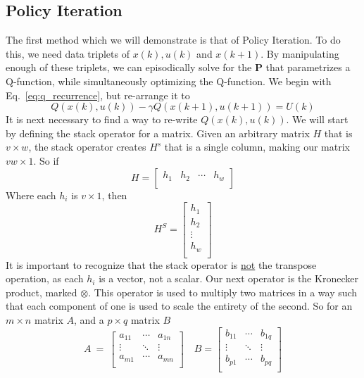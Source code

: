 \FloatBarrier\subsection{Policy Iteration} %
The first method which we will demonstrate is that of Policy Iteration. To do this, we need data triplets of $x\left(k\right),u\left(k\right)$ and $x\left(k+1\right)$. By manipulating enough of these triplets, we can episodically solve for the \textbf{P} that parametrizes a Q-function, while simultaneously optimizing the Q-function. We begin with Eq.~\ref{eq:q_recurrence}, but re-arrange it to
\begin{equation}
    Q\left(x\left(k\right),u\left(k\right)\right) - \gamma Q\left(x\left(k+1\right),u\left(k+1\right)\right)=U\left(k\right)
    \label{eq:q-gamma_q}
\end{equation}
It is next necessary to find a way to re-write $Q\left(x\left(k\right),u\left(k\right)\right)$. 
We will start by defining the stack operator for a matrix. Given an arbitrary matrix $H$ that is $v\times w$, the stack operator creates $H^s$ that is a single column, making our matrix $vw \times1$. So if
\begin{equation}
    H = \left[\begin{matrix}h_1&h_2&\cdots&h_w\\\end{matrix}\right]
    \label{eq:H_prestack}
\end{equation}
Where each $h_i$ is $v\times1$, then
\begin{equation}
    H^S=\left[\begin{matrix}h_1\\h_2\\\vdots\\h_w\\\end{matrix}\right]
    \label{eq:H_stacked}
\end{equation}
It is important to recognize that the stack operator is \underline{not} the transpose operation, as each $h_i$ is a vector, not a scalar.
Our next operator is the Kronecker product, marked $\otimes$. This operator is used to multiply two matrices in a way such that each component of one is used to scale the entirety of the second. So for an $m \times n$ matrix $A$, and a $p \times q$ matrix $B$
\begin{equation}
    A\ =\ \left[\begin{matrix}a_{11}&\cdots&a_{1n}\\\vdots&\ddots&\vdots\\a_{m1}&\cdots& a_{mn}\\\end{matrix}\right]	
    \quad
    B=\left[\begin{matrix}b_{11}&\cdots&b_{1q}\\\vdots&\ddots&\vdots\\b_{p1}&\cdots&b_{pq}\\\end{matrix}\right]
\end{equation}
